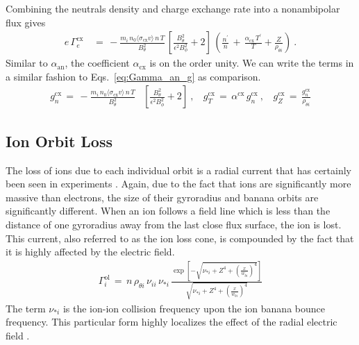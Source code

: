 Combining the neutrals density and charge exchange rate into a nonambipolar flux gives
\begin{align} %
	e\,\Gamma_e^\text{cx} \,&=\,
		-\frac{m_i \,n_0 \langle\sigma_\text{cx} v\rangle \, n\,T}{B_\theta^2}
		\, \left[\frac{B_\theta^2}{\epsilon^2 B_\phi^2} + 2\right] \,
		\left(\frac{n^\prime}{n} \,+\, \frac{\alpha_\text{cx}\,T^\prime}
		{T} + \frac{Z}{\rho_{\theta i}}\right)~. \label{eq:Gamma_cx}
\end{align}
Similar to $\alpha_\text{an}$, the coefficient $\alpha_\text{cx}$ is on the order unity.
We can write the terms in a similar fashion to Eqs.~\ref{eq:Gamma_an_g} as comparison.
\begin{align} %
	g_n^\text{cx} \,=\, -\frac{m_i \,n_0 \langle\sigma_\text{cx} v\rangle \, n \, T}
		{B_\theta^2}& \left[\frac{B_\theta^2}{\epsilon^2 B_\phi^2} + 2\right]
		~,~~~~ g_T^\text{cx} \,=\, \alpha^\text{cx}\,g_n^\text{cx}~,~~~~
		g_Z^\text{cx} \,=\, \frac{g_n^\text{cx}}{\rho_{\theta i}}
		\label{eq:g_cx}
\end{align}


\subsection{Ion Orbit Loss}\label{ssec:ol_loss}
The loss of ions due to each individual orbit is a radial current that has certainly been seen in experiments \cite{weisen_boundary_1991}.
Again, due to the fact that ions are significantly more massive than electrons, the size of their gyroradius and banana orbits are significantly different.
When an ion follows a field line which is less than the distance of one gyroradius away from the last close flux surface, the ion is lost.
This current, also referred to as the ion loss cone, is compounded by the fact that it is highly affected by the electric field.
\begin{align} %
	\Gamma_i^\text{ol} \,=\, n \, \rho_{\theta i} \, \nu_{ii} \, \nu_{*i} \,
		\frac{\exp\left[-\sqrt{\nu_{*i} + Z^4
		+ \left(\frac{x}{w_{bi}}\right)^4}\right]}{\sqrt{\nu_{*i} + Z^4
		+ \left(\frac{x}{w_{bi}}\right)^4}} \label{eq:Gamma_ol}
\end{align}
The term $\nu_{*i}$ is the ion-ion collision frequency upon the ion banana bounce frequency. %
This particular form highly localizes the effect of the radial electric field \cite{kobayashi_experimental_2016}.

